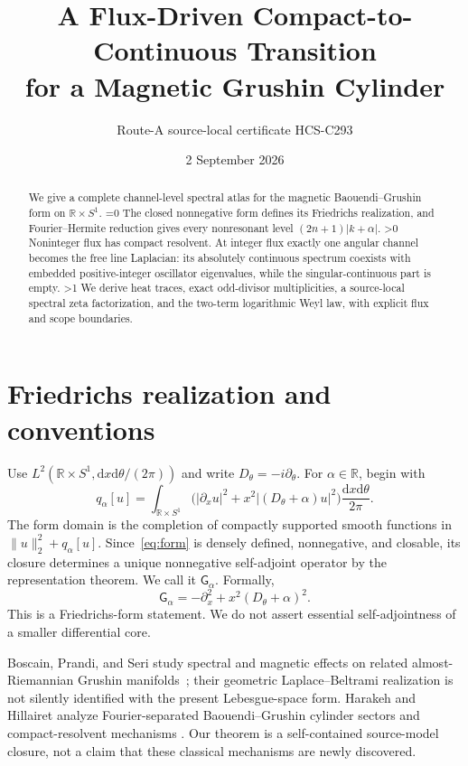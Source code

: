 \documentclass[10pt]{article}
\title{A Flux-Driven Compact-to-Continuous Transition\\
for a Magnetic Grushin Cylinder}
\author{Route-A source-local certificate HCS-C293}
\date{2 September 2026}
\providecommand{\CRevisionRound}{2}
\newcommand{\R}{\mathbb R}
\newcommand{\D}{\mathrm d}
\newcommand{\G}{\mathsf G}
\begin{document}
\maketitle

\begin{abstract}
We give a complete channel-level spectral atlas for the magnetic
Baouendi--Grushin form on $\R\times S^1$.
\ifnum\CRevisionRound=0
The closed nonnegative form defines its Friedrichs realization, and
Fourier--Hermite reduction gives every nonresonant level
$(2n+1)|k+\alpha|$.
\fi
\ifnum\CRevisionRound>0
Noninteger flux has compact resolvent.  At integer flux exactly one angular
channel becomes the free line Laplacian: its absolutely continuous spectrum
coexists with embedded positive-integer oscillator eigenvalues, while the
singular-continuous part is empty.
\fi
\ifnum\CRevisionRound>1
We derive heat traces, exact odd-divisor multiplicities, a source-local
spectral zeta factorization, and the two-term logarithmic Weyl law, with
explicit flux and scope boundaries.
\fi
\end{abstract}

\section{Friedrichs realization and conventions}
Use $L^2(\R\times S^1,\D x\D\theta/(2\pi))$ and write
$D_\theta=-i\partial_\theta$.  For $\alpha\in\R$, begin with
\begin{equation}\label{eq:form}
 q_\alpha[u]=\int_{\R\times S^1}
 \bigl(|\partial_xu|^2+x^2|(D_\theta+\alpha)u|^2\bigr)
 \frac{\D x\D\theta}{2\pi}.
\end{equation}
The form domain is the completion of compactly supported smooth functions in
$\lVert u\rVert_2^2+q_\alpha[u]$.  Since~\eqref{eq:form} is densely defined,
nonnegative, and closable, its closure determines a unique nonnegative
self-adjoint operator by the representation theorem.  We call it
$\G_\alpha$.  Formally,
\[
 \G_\alpha=-\partial_x^2+x^2(D_\theta+\alpha)^2.
\]
This is a Friedrichs-form statement.  We do not assert essential
self-adjointness of a smaller differential core.

Boscain, Prandi, and Seri study spectral and magnetic effects on related
almost-Riemannian Grushin manifolds~\cite{BPS2016}; their geometric
Laplace--Beltrami realization is not silently identified with the present
Lebesgue-space form.  Harakeh and Hillairet analyze Fourier-separated
Baouendi--Grushin cylinder sectors and compact-resolvent mechanisms
\cite{HH2023}.  Our theorem is a self-contained source-model closure, not a
claim that these classical mechanisms are newly discovered.
\end{document}
